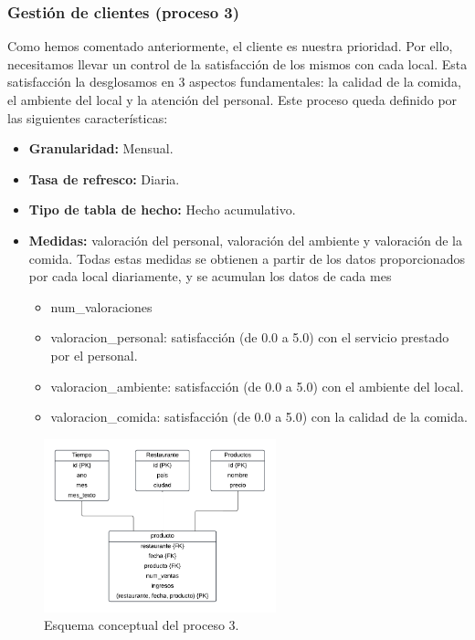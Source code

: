 \documentclass[12pt]{opticajnl}
\begin{document}
\subsubsection{Gestión de clientes (proceso 3)}

Como hemos comentado anteriormente, el cliente es nuestra prioridad. Por ello, necesitamos llevar un control de la satisfacción de los mismos con cada local. Esta satisfacción la desglosamos en 3 aspectos fundamentales: la calidad de la comida, el ambiente del local y la atención del personal. Este proceso queda definido por las siguientes características:
\begin{itemize}
\item \textbf{Granularidad:} Mensual.
\item \textbf{Tasa de refresco:} Diaria.
\item \textbf{Tipo de tabla de hecho:} Hecho acumulativo.
\item \textbf{Medidas:} valoración del personal, valoración del ambiente y valoración de la comida. Todas estas medidas se obtienen a partir de los datos proporcionados por cada local diariamente, y se acumulan los datos de cada mes
\begin{itemize}
\item num\_valoraciones
\item valoracion\_personal: satisfacción (de 0.0 a 5.0) con el servicio prestado por el personal.
\item valoracion\_ambiente: satisfacción (de 0.0 a 5.0) con el ambiente del local.
\item valoracion\_comida: satisfacción (de 0.0 a 5.0) con la calidad de la comida.
\end{itemize}
\end{itemize}

\begin{figure}[H]
\centering
\includegraphics[width=0.6\textwidth]{fotos/feed.pdf}
\caption{Esquema conceptual del proceso 3.}
\label{fig:esquema_proceso3}
\end{figure}
\end{document}
